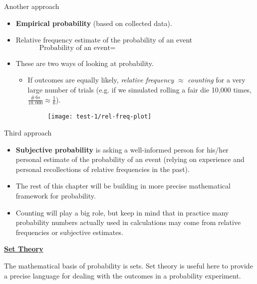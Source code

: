 \documentclass{article}
\newcommand{\bu}[1]{\textbf{\ul{#1}}}			%
\begin{document}
Another approach\bigskip
\begin{itemize}
    \item \textbf{Empirical probability} (based on collected data).
    \item Relative frequency estimate of the probability of an event
    \[
    \text{Probability of an event} = \hspace{200pt}
    \]
    \item These are two ways of looking at probability.
    \begin{itemize}
        \item If outcomes are equally likely, \textit{relative frequency} $\approx$ \textit{counting} for a very large number of trials (e.g. if we simulated rolling a fair die 10,000 times, $\frac{\# \, 6s}{10,000} \approx \frac{1}{6}$).
        \begin{figure}[H]
            \center\texttt{[image: test-1/rel-freq-plot]}
        \end{figure}
    \end{itemize}
\end{itemize}\bigskip

Third approach\bigskip
\begin{itemize}
    \item \textbf{Subjective probability} is asking a well-informed person for his/her personal estimate of the probability of an event (relying on experience and personal recollections of relative frequencies in the past).
    \item The rest of this chapter will be building in more precise mathematical framework for probability.
    \item Counting will play a big role, but keep in mind that in practice many probability numbers actually used in calculations may come from relative frequencies or subjective estimates.
\end{itemize}\bigskip

\bu{Set Theory}\bigskip

The mathematical basis of probability is sets. Set theory is useful here to provide a precise language for dealing with the outcomes in a probability experiment.\bigskip
\end{document}
